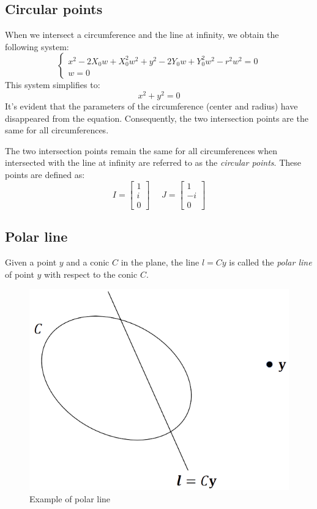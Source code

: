 \subsection*{Circular points}
\begin{example}
    When we intersect a circumference and the line at infinity, we obtain the following system:
    \[\begin{cases}
        x^2-2X_0w+X_0^2w^2+y^2-2Y_0w+Y_0^2w^2-r^2w^2=0 \\
        w=0
    \end{cases}\]
    This system simplifies to: 
    \[x^2+y^2=0\]
    It's evident that the parameters of the circumference (center and radius) have disappeared from the equation. 
    Consequently, the two intersection points are the same for all circumferences.    
\end{example}
\newpage
\begin{definition}
    The two intersection points remain the same for all circumferences when intersected with the line at infinity are referred to as the \emph{circular points}.
    These points are defined as:
    \[I=\begin{bmatrix} 1 \\ i \\ 0 \end{bmatrix} \:\:\:\:\:\: J=\begin{bmatrix} 1 \\ -i \\ 0 \end{bmatrix}\]
\end{definition}

\subsection*{Polar line}
\begin{definition}
    Given a point $y$ and a conic $C$ in the plane, the line $l=Cy$ is called the \emph{polar line} of point $y$ with respect to the conic $C$. 
\end{definition}
\begin{figure}[H]
    \centering
    \includegraphics[width=0.3\linewidth]{images/polar.png}
    \caption{Example of polar line}
\end{figure}

